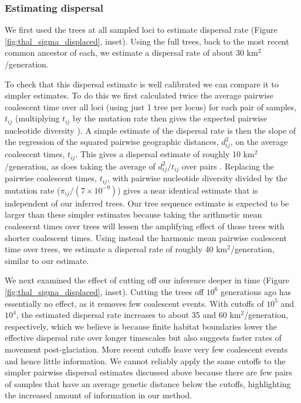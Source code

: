 \documentclass[12pt]{article}
\begin{document}
\subsubsection*{Estimating dispersal}

We first used the trees at all sampled loci to estimate dispersal rate (Figure \ref{fig:thal_sigma_displaced}, inset). Using the full trees, back to the most recent common ancestor of each, we estimate a dispersal rate of about $30$ km$^2$/generation. 

To check that this dispersal estimate is well calibrated we can compare it to simpler estimates. To do this we first calculated twice the average pairwise coalescent time over all loci (using just 1 tree per locus) for each pair of samples, $t_{ij}$ (multiplying $t_{ij}$ by the mutation rate then gives the expected pairwise nucleotide diversity \citep{ralph2020efficiently}). A simple estimate of the dispersal rate is then the slope of the regression of the squared pairwise geographic distances, $d_{ij}^2$, on the average coalescent times, $t_{ij}$. This gives a dispersal estimate of roughly 10 km$^2$/generation, as does taking the average of $d_{ij}^2/t_{ij}$ over pairs \citep{ianni2023exploring}. Replacing the pairwise coalescent times, $t_{ij}$, with pairwise nucleotide diversity divided by the mutation rate ($\pi_{ij}/(7\times10^{-9})$) gives a near identical estimate that is independent of our inferred trees. Our tree sequence estimate is expected to be larger than these simpler estimates because taking the arithmetic mean coalesecnt times over trees will lessen the amplifying effect of those trees with shorter coalescent times. Using instead the harmonic mean pairwise coalescent time over trees, we estimate a dispersal rate of roughly 40 km$^2$/generation, similar to our estimate. 

We next examined the effect of cutting off our inference deeper in time (Figure \ref{fig:thal_sigma_displaced}, inset). Cutting the trees off $10^6$ generations ago has essentially no effect, as it removes few coalescent events. With cutoffs of $10^5$ and $10^4$, the estimated dispersal rate increases to about 35 and 60 km$^2$/generation, respectively, which we believe is because finite habitat boundaries lower the effective dispersal rate over longer timescales but also suggests faster rates of movement post-glaciation. More recent cutoffs leave very few coalescent events and hence little information. We cannot reliably apply the same cutoffs to the simpler pairwise dispersal estimates discussed above because there are few pairs of samples that have an average genetic distance below the cutoffs, highlighting the increased amount of information in our method.
\end{document}
